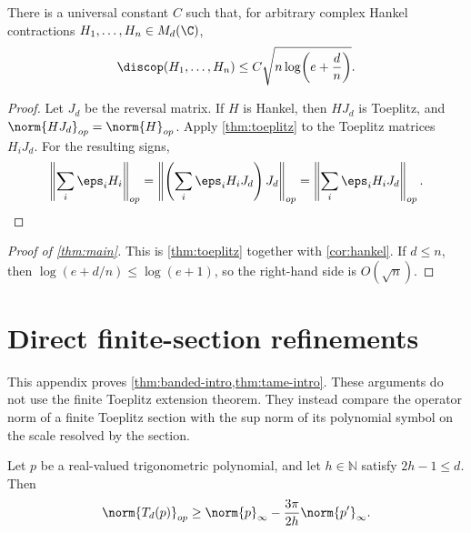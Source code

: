 \begin{corollary}\label{cor:hankel}
There is a universal constant $C$ such that, for arbitrary complex Hankel
contractions $H_1,\ldots,H_n\in M_d(\C)$,
\[
   \discop(H_1,\ldots,H_n)
   \le C\sqrt{n\log\!\left(e+\frac dn\right)} .
\]
\end{corollary}

\begin{proof}
Let $J_d$ be the reversal matrix.  If $H$ is Hankel, then $HJ_d$ is Toeplitz,
and $\norm{HJ_d}_{op}=\norm{H}_{op}$.  Apply \cref{thm:toeplitz} to the Toeplitz
matrices $H_iJ_d$.  For the resulting signs,
\[
   \left\|\sum_i\eps_i H_i\right\|_{op}
   =\left\|\left(\sum_i\eps_i H_iJ_d\right)J_d\right\|_{op}
   =\left\|\sum_i\eps_i H_iJ_d\right\|_{op} .
\]
\end{proof}

\begin{proof}[Proof of \cref{thm:main}]
This is \cref{thm:toeplitz} together with \cref{cor:hankel}.  If $d\le n$, then
$\log(e+d/n)\le\log(e+1)$, so the right-hand side is $O(\sqrt n)$.
\end{proof}

\appendix

\section{Direct finite-section refinements}\label{app:finite-section}

This appendix proves \cref{thm:banded-intro,thm:tame-intro}.  These arguments do
not use the finite Toeplitz extension theorem.  They instead compare the
operator norm of a finite Toeplitz section with the sup norm of its polynomial
symbol on the scale resolved by the section.

\begin{lemma}\label{lem:window}
Let $p$ be a real-valued trigonometric polynomial, and let $h\in\mathbb N$ satisfy
$2h-1\le d$.  Then
\[
   \norm{T_d(p)}_{op}
   \ge \norm{p}_\infty - \frac{3\pi}{2h}\norm{p'}_\infty .
\]
\end{lemma}

